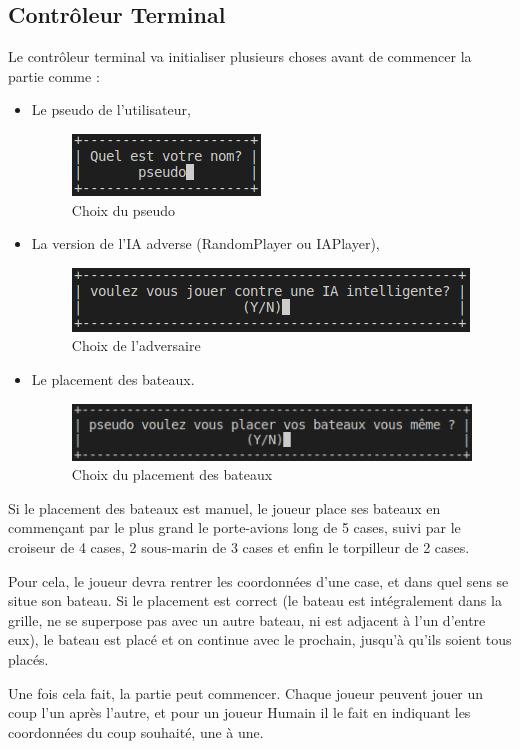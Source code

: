 \subsection{Contrôleur Terminal}
Le contrôleur terminal va initialiser plusieurs choses avant de commencer la partie comme :\begin{itemize}
\item Le pseudo de l'utilisateur,
    \begin{figure}[htp]
        \centering
        \includegraphics[scale=1]{images/terminal/ChoixNom.png}
        \caption{\label{fig: ChoixNomTe}Choix du pseudo}
    \end{figure}
\item La version de l'IA adverse (RandomPlayer ou IAPlayer),\\
    \begin{figure}[htp]
        \centering
        \includegraphics[scale=0.5]{images/terminal/ChoixAdversaire.png}
        \caption{\label{fig: ChoixAdversaireT}Choix de l'adversaire}
    \end{figure}
\item Le placement des bateaux.\\
    \begin{figure}[htp]
        \centering
        \includegraphics[scale=1]{images/terminal/ChoixPlacement.png}
        \caption{\label{fig: ChoixPlacementT}Choix du placement des bateaux}
    \end{figure}
\end{itemize}
\par Si le placement des bateaux est manuel, le joueur place ses bateaux en commençant par le plus grand le porte-avions long de 5 cases, suivi par le croiseur de 4 cases, 2 sous-marin de 3 cases et enfin le torpilleur de 2 cases.
\par Pour cela, le joueur devra rentrer les coordonnées d'une case, et dans quel sens se situe son bateau. Si le placement est correct (le bateau est intégralement dans la grille, ne se superpose pas avec un autre bateau, ni est adjacent à l'un d'entre eux), le bateau est placé et on continue avec le prochain, jusqu'à qu'ils soient tous placés.
\par Une fois cela fait, la partie peut commencer. Chaque joueur peuvent jouer un coup l'un après l'autre, et pour un joueur Humain il le fait en indiquant les coordonnées du coup souhaité, une à une.